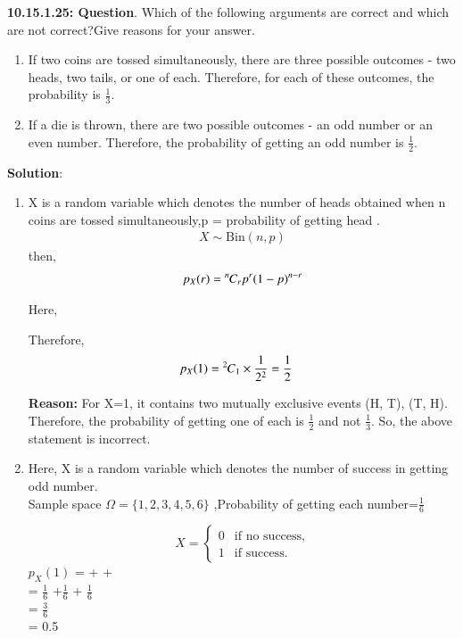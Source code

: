 \documentclass[journal,12pt,twocolumn]{IEEEtran}
\begin{document}
\textbf{10.15.1.25: Question}. Which of the following arguments are correct and which are not correct?Give reasons for your answer.
\begin{enumerate}
\item If two coins are tossed simultaneously, there are three possible outcomes - two heads, two tails, or one of each. Therefore, for each of these outcomes, the probability is $\frac{1}{3}$.

\item If a die is thrown, there are two possible outcomes - an odd number or an even number. Therefore, the probability of getting an odd number is $\frac{1}{2}$.
\end{enumerate}
\textbf{Solution}:
\begin{enumerate}
\item X is a random variable which denotes the number of heads obtained when n coins are tossed simultaneously,p = probability of getting head .\\


\begin{align}
X\sim \text{Bin}(n,p)
\end{align} 
then,
\begin{align}
	p_X(r) = {{}^{n}\mkern-1muC_{r}} p^r (1-p)^{n-r}
\end{align}

Here, 
\begin{table}[htbp]
\centering


\caption{}
\end{table}

Therefore,
\begin{align}
       p_X(1) &= {{}^{2}\mkern-1muC_{1}} \times \frac{1}{2^2} = \frac{1}{2}
\end{align}


\textbf{Reason:} For X=1, it contains two mutually exclusive events (H, T), (T, H). Therefore, the probability of getting one of each is $\frac{1}{2}$ and not $\frac{1}{3}$. So, the above statement is incorrect.\\

\item Here, X is a random variable which denotes the number of success in getting odd number.\\ Sample space $\Omega = \{1,2,3,4,5,6\}$ ,Probability of getting each number=$\frac{1}{6}$

\[ X = \begin{cases}
        0 & \text{if no success}, \\
        1 & \text{if success}.
      \end{cases}
\]
$p_X(1)$ =  + + \\
= $\frac{1}{6}$ +$\frac{1}{6}$ + $\frac{1}{6}$\\
= $\frac{3}{6}$\\
= 0.5
\begin{table}[htbp]
\centering

\caption{}


\end{table}
\end{enumerate}
\end{document}

